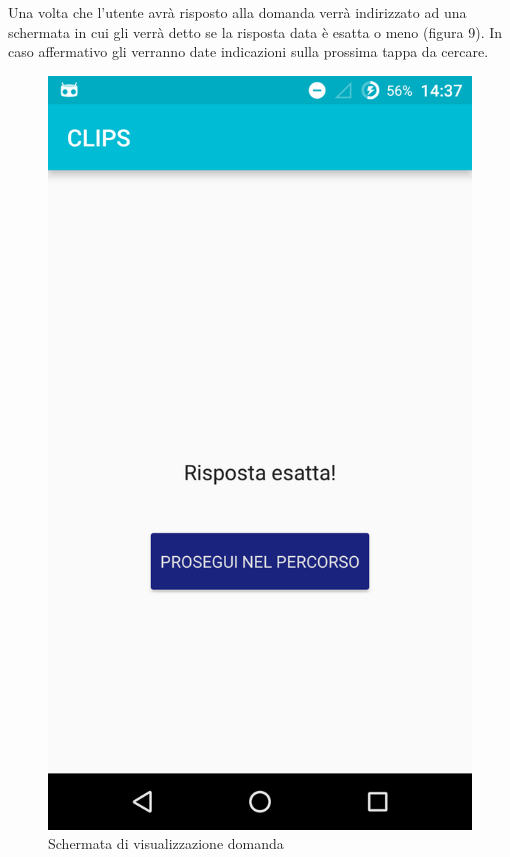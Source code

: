 Una volta che l'utente avrà risposto alla domanda verrà indirizzato ad una schermata in cui gli verrà detto se la risposta data è esatta o meno (figura 9). In caso affermativo gli verranno date indicazioni sulla prossima tappa da cercare.

\begin{figure}[!h]
	\centering
	\includegraphics[scale=0.15]{screenshot/risultato_prova}
	\caption{Schermata di visualizzazione domanda}
\end{figure}